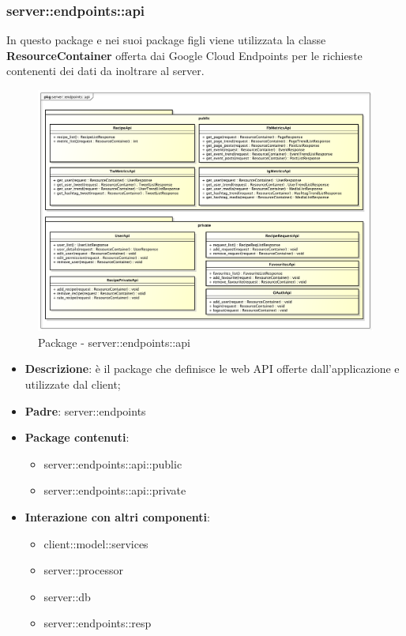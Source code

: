 \subsubsection{server::endpoints::api} %
\label{ssub:bdsm_app_server_endpoints_api}

	In questo package e nei suoi package figli viene utilizzata la classe \textbf{ResourceContainer} offerta dai Google Cloud Endpoints per le richieste contenenti dei dati da inoltrare al server.
\begin{figure}[!htbp]
	\centering
	\centerline{\includegraphics[scale=0.4]{./images/server/api.pdf}}
	\caption{Package - server::endpoints::api}
\end{figure}

\begin{itemize}
  \item \textbf{Descrizione}: è il package che definisce le web API offerte dall'applicazione e utilizzate dal client;
  \item \textbf{Padre}: server::endpoints
  \item \textbf{Package contenuti}:
  	\begin{itemize}
  		\item server::endpoints::api::public
  		\item server::endpoints::api::private
	\end{itemize}
  \item \textbf{Interazione con altri componenti}:
  	\begin{itemize}
  		\item client::model::services
  		\item server::processor
  		\item server::db
			\item server::endpoints::resp
	\end{itemize}
\end{itemize}

